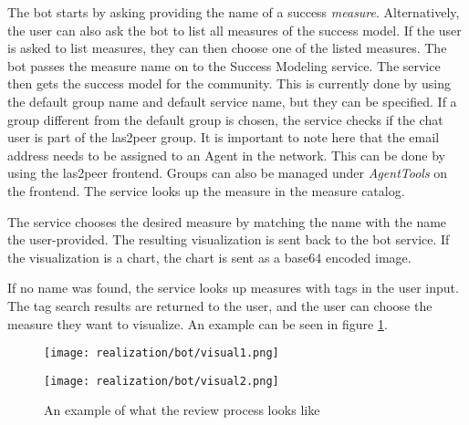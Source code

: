 The bot starts by asking providing the name of a success \emph{measure}. Alternatively, the user can also ask the bot to list all measures of the success model.
If the user is asked to list measures, they can then choose one of the listed measures. 
The bot passes the measure name on to the Success Modeling service. The service then gets the success model for the community. This is currently done by using the default group name and default service name, but they can be specified.
If a group different from the default group is chosen, the service checks if the chat user is part of the las2peer group. 
It is important to note here that the email address needs to be assigned to an Agent in the network. 
This can be done by using the las2peer frontend. 
Groups can also be managed under \emph{AgentTools} on the frontend.  
The service looks up the measure in the measure catalog. 

The service chooses the desired measure by matching the name with the name the user-provided. 
The resulting visualization is sent back to the bot service. If the visualization is a chart, the chart is sent as a base64 encoded image.

If no name was found, the service looks up measures with tags in the user input. The tag search results are returned to the user, and the user can choose the measure they want to visualize.
An example can be seen in figure \ref{fig:visualReq}.

\begin{figure}[h]
    \begin{minipage}[t]{0.5\textwidth}
        \centering
\vspace{0pt}

        \texttt{[image: realization/bot/visual1.png]} 
    \end{minipage}
    \begin{minipage}[t]{0.5\textwidth}
        \centering
\vspace{0pt}

        \texttt{[image: realization/bot/visual2.png]}
    \end{minipage}
    \caption{An example of what the review process looks like}
    \label{fig:visualReq}
\end{figure}


